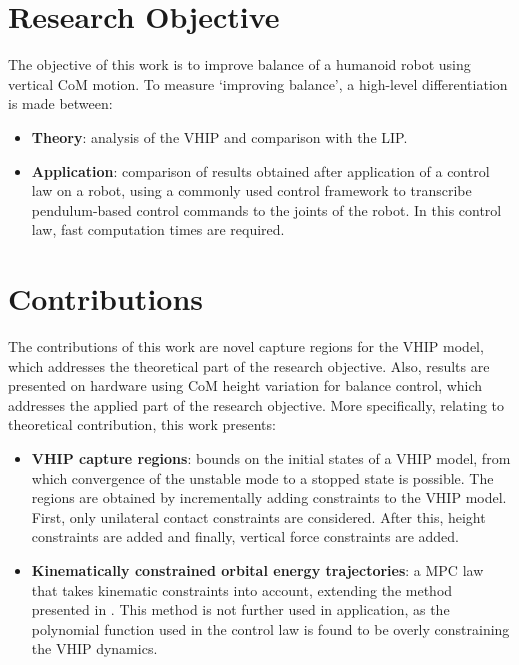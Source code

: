 \section{Research Objective}
The objective of this work is to improve balance of a humanoid robot using vertical \ac{CoM} motion. To measure `improving balance', a high-level differentiation is made between:
\begin{itemize}
	\item \textbf{Theory}: analysis of the \acf{VHIP} and comparison with the \acf{LIP}.
	\item \textbf{Application}: comparison of results obtained after application of a control law on a robot, using a commonly used control framework to transcribe pendulum-based control commands to the joints of the robot. In this control law, fast computation times are required.
\end{itemize}

\section{Contributions}
The contributions of this work are novel capture regions for the \acf{VHIP} model, which addresses the theoretical part of the research objective. Also, results are presented on hardware using \ac{CoM} height variation for balance control, which addresses the applied part of the research objective. More specifically, relating to theoretical contribution, this work presents:
\begin{itemize}
	\item \textbf{\ac{VHIP} capture regions}: bounds on the initial states of a \ac{VHIP} model, from which convergence of the unstable mode to a stopped state is possible. The regions are obtained by incrementally adding constraints to the \ac{VHIP} model. First, only unilateral contact constraints are considered. After this, height constraints are added and finally, vertical force constraints are added.
      \item \textbf{Kinematically constrained orbital energy trajectories}: a \ac{MPC} law that takes kinematic constraints into account, extending the method presented in \cite{koolen2016balance}. This method is not further used in application, as the polynomial function used in the control law is found to be overly constraining the \ac{VHIP} dynamics.
\end{itemize}

